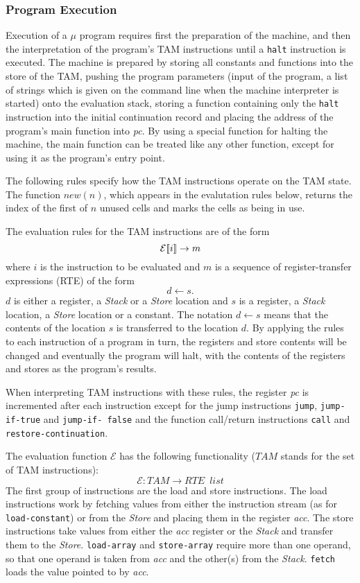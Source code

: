 \subsubsection{Program Execution}

Execution of a $\mu$\turtle{} program requires first the preparation
of the machine, and then the interpretation of the program's TAM
instructions until a {\tt halt} instruction is executed.  The machine
is prepared by storing all constants and functions into the store of
the TAM, pushing the program parameters (input of the program, a list
of strings which is given on the command line when the machine
interpreter is started) onto the evaluation stack, storing a function
containing only the {\tt halt} instruction into the initial
continuation record and placing the address of the program's main
function into {\em pc}.  By using a special function for halting the
machine, the main function can be treated like any other function,
except for using it as the program's entry point.

The following rules specify how the TAM instructions operate on the
TAM state.  The function $new(n)$, which appears in the evalutation
rules below, returns the index of the first of $n$ unused cells and
marks the cells as being in use.  

%
The evaluation rules for the TAM instructions are of the form 
%
$${\mathcal{E}{\normalfont [\![} i {\normalfont ]\!]}}\rightarrow m$$
%
where $i$ is the instruction to be evaluated and $m$ is a sequence of
register-transfer expressions%
%
 (RTE) of the form
%
$$d\leftarrow s.$$
%
$d$ is either a register, a {\em Stack} or a {\em Store} location and
$s$ is a register, a {\em Stack} location, a {\em Store} location or a
constant.  The notation $d\leftarrow s$ means that the contents of the
location $s$ is transferred to the location $d$.  By applying the
rules to each instruction of a program in turn, the registers and
store contents will be changed and eventually the program will halt,
with the contents of the registers and stores as the program's
results.

When interpreting TAM instructions with these rules, the register {\em
  pc} is incremented after each instruction except for the jump
instructions {\tt jump}, {\tt jump-if-true} and {\tt jump-if- false}
and the function call/return instructions {\tt call} and {\tt
  restore-continuation}.  

The evaluation function $\mathcal{E}$ has the following functionality
($TAM$ stands for the set of TAM instructions):
%
$$\mathcal{E}: TAM\rightarrow RTE\,\,\,list$$
%
The first group of instructions are the load and store instructions.
The load instructions work by fetching values from either the
instruction stream (as for {\tt load-constant}) or from the {\em
  Store} and placing them in the register {\em acc}.  The store
instructions take values from either the {\em acc} register or the
{\em Stack} and transfer them to the {\em Store}.  {\tt load-array}
and {\tt store-array} require more than one operand, so that one
operand is taken from {\em acc} and the other(s) from the {\em Stack}.
{\tt fetch} loads the value pointed to by {\em acc}.

